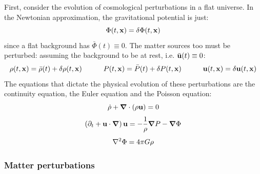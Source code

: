 First, consider the evolution of cosmological perturbations in a flat universe. In the Newtonian approximation, the gravitational potential is just:
\begin{equation}
  \Phi(t,\mathbf{x}) = \delta \Phi(t,\mathbf{x})
\end{equation}
since a flat background has $ \bar \Phi(t) \equiv 0 $. The matter sources too must be perturbed: assuming the background to be at rest, i.e. $ \bar{\mathbf{u}}(t) \equiv 0 $:
\begin{equation}
  \rho(t,\mathbf{x}) = \bar \rho(t) + \delta \rho(t,\mathbf{x})
  \qquad \quad
  P(t,\mathbf{x}) = \bar P(t) + \delta P(t,\mathbf{x})
  \qquad \quad
  \mathbf{u}(t,\mathbf{x}) = \delta \mathbf{u}(t,\mathbf{x})
\end{equation}
The equations that dictate the physical evolution of these perturbations are the continuity equation, the Euler equation and the Poisson equation:
\begin{equation}
  \dot{\rho} + \boldsymbol{\nabla}\cdot (\rho \mathbf{u}) = 0
  \label{eq:continuity}
\end{equation}
\begin{equation}
  \left( \partial_t + \mathbf{u} \cdot \boldsymbol{\nabla} \right) \mathbf{u} = - \frac{1}{\rho} \boldsymbol{\nabla} P - \boldsymbol{\nabla} \Phi
  \label{eq:euler}
\end{equation}
\begin{equation}
  \nabla^2 \Phi = 4\pi G \rho
  \label{eq:poisson}
\end{equation}

\subsubsection{Matter perturbations}

